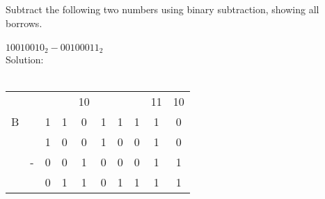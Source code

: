 Subtract the following two numbers using binary subtraction, showing all borrows. \\
\\
$10010010_2 - 00100011_2$ \\

Solution: \\
\\
\begin{tabular}{cccccccccc}
    &   &   &   & 10&   &   &   & 11& 10\\
  B &   & 1 & 1 & 0 & 1 & 1 & 1 & 1 & 0 \\
    &   & 1 & 0 & 0 & 1 & 0 & 0 & 1 & 0 \\
    & - & 0 & 0 & 1 & 0 & 0 & 0 & 1 & 1 \\
  \hline
    &   & 0 & 1 & 1 & 0 & 1 & 1 & 1 & 1 \\
\end{tabular} \\

